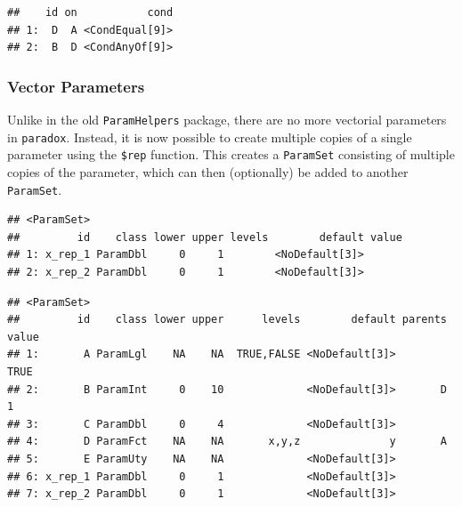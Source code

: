 \documentclass[]{scrbook}
\newenvironment{Shaded}{\begin{snugshade}}{\end{snugshade}}
\newcommand{\DataTypeTok}[1]{\textcolor[rgb]{0.13,0.29,0.53}{#1}}
\newcommand{\DecValTok}[1]{\textcolor[rgb]{0.00,0.00,0.81}{#1}}
\newcommand{\KeywordTok}[1]{\textcolor[rgb]{0.13,0.29,0.53}{\textbf{#1}}}
\newcommand{\NormalTok}[1]{#1}
\newcommand{\OperatorTok}[1]{\textcolor[rgb]{0.81,0.36,0.00}{\textbf{#1}}}
\newcommand{\StringTok}[1]{\textcolor[rgb]{0.31,0.60,0.02}{#1}}
\renewenvironment{Shaded} {\begin{snugshade}\small} {\end{snugshade}}
\begin{document}
\begin{Shaded}
\end{Shaded}

\begin{verbatim}
##    id on           cond
## 1:  D  A <CondEqual[9]>
## 2:  B  D <CondAnyOf[9]>
\end{verbatim}

\hypertarget{vector-parameters}{%
\subsubsection{Vector Parameters}\label{vector-parameters}}

Unlike in the old \texttt{ParamHelpers} package, there are no more vectorial parameters in \texttt{paradox}.
Instead, it is now possible to create multiple copies of a single parameter using the \texttt{\$rep} function.
This creates a \texttt{ParamSet} consisting of multiple copies of the parameter, which can then (optionally) be added to another \texttt{ParamSet}.

\begin{Shaded}
\end{Shaded}

\begin{verbatim}
## <ParamSet>
##         id    class lower upper levels        default value
## 1: x_rep_1 ParamDbl     0     1        <NoDefault[3]>      
## 2: x_rep_2 ParamDbl     0     1        <NoDefault[3]>
\end{verbatim}

\begin{Shaded}
\end{Shaded}

\begin{verbatim}
## <ParamSet>
##         id    class lower upper      levels        default parents value
## 1:       A ParamLgl    NA    NA  TRUE,FALSE <NoDefault[3]>          TRUE
## 2:       B ParamInt     0    10             <NoDefault[3]>       D     1
## 3:       C ParamDbl     0     4             <NoDefault[3]>              
## 4:       D ParamFct    NA    NA       x,y,z              y       A      
## 5:       E ParamUty    NA    NA             <NoDefault[3]>              
## 6: x_rep_1 ParamDbl     0     1             <NoDefault[3]>              
## 7: x_rep_2 ParamDbl     0     1             <NoDefault[3]>
\end{verbatim}
\end{document}
